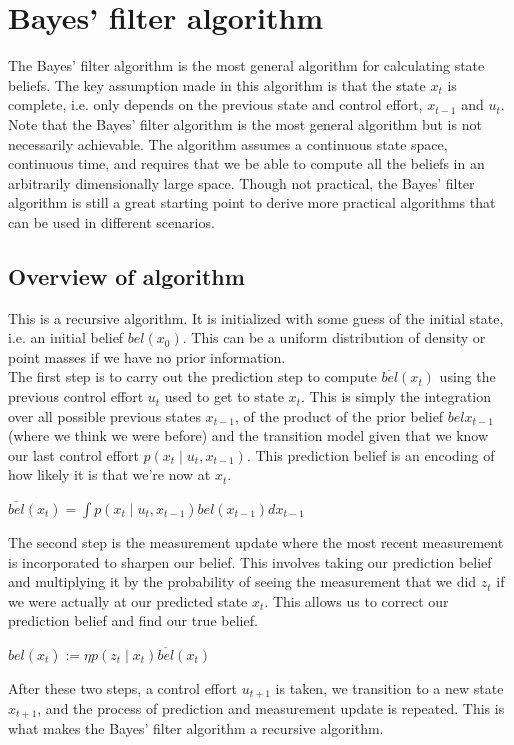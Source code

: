 \documentclass[twoside]{article}
\begin{document}
\section{Bayes' filter algorithm}
The Bayes' filter algorithm is the most general algorithm for calculating state beliefs. The key assumption made in this algorithm is that the state $x_t$ is complete, i.e. only depends on the previous state and control effort, $x_{t-1}$ and $u_t$. Note that the Bayes' filter algorithm is the most general algorithm but is not necessarily achievable. The algorithm assumes a continuous state space, continuous time, and requires that we be able to compute all the beliefs in an arbitrarily dimensionally large space. Though not practical, the Bayes' filter algorithm is still a great starting point to derive more practical algorithms that can be used in different scenarios. 

\subsection{Overview of algorithm}
This is a recursive algorithm. It is initialized with some guess of the initial state, i.e. an initial belief $bel(x_0)$. This can be a uniform distribution of density or point masses if we have no prior information. \\
The first step is to carry out the prediction step to compute $\overline{bel}(x_t)$ using the previous control effort $u_t$ used to get to state $x_t$. This is simply the integration over all possible previous states $x_{t-1}$, of the product of the prior belief $bel{x_{t-1}}$ (where we think we were before) and the transition model given that we know our last control effort $p(x_t \mid u_t, x_{t-1})$. This prediction belief is an encoding of how likely it is that we're now at $x_t$.
\begin{center}
$\overline{bel}(x_t)= \int p(x_t \mid u_t, x_{t-1}) bel({x_{t-1}}) dx_{t-1}$
\end{center}
The second step is the measurement update where the most recent measurement is incorporated to sharpen our belief. This involves taking our prediction belief and multiplying it by the probability of seeing the measurement that we did $z_t$ if we were actually at our predicted state $x_t$. This allows us to correct our prediction belief and find our true belief. 
\begin{center}
$bel(x_t):=\eta p(z_t\mid x_t) \overline{bel}(x_t) $
\end{center} 
After these two steps, a control effort $u_{t+1}$ is taken, we transition to a new state $x_{t+1}$, and the process of prediction and measurement update is repeated. This is what makes the Bayes' filter algorithm a recursive algorithm. 
\end{document}
